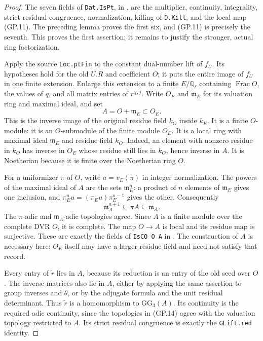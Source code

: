 \begin{proof}
The seven fields of \texttt{Dat.IsPt}, in
, are the multiplier,
continuity, integrality, strict residual congruence,
normalization, killing of \texttt{D.Kill}, and the local map
(GP.11).  The preceding lemma proves the first six, and (GP.11)
is precisely the seventh.  This proves the first assertion;
it remains to justify the stronger, actual ring factorization.

Apply the source \texttt{Loc.ptFin} to the constant dual-number
lift of $f_U$.  Its hypotheses hold for the old $U.R$ and
coefficient $O$; it puts the entire image of $f_U$ in one finite
extension.  Enlarge this extension to a finite $E/\mathbb Q_\ell$
containing $\operatorname{Frac}O$, the values of $q$, and all
matrix entries of $r^{\chi,j}$.  Write $O_E$ and $\mathfrak m_E$
for its valuation ring and maximal ideal, and set
\[
        A=O+\mathfrak m_E\subset O_E.                        \tag{GP.13}
\]
This is the inverse image of the original residue field $k_O$
inside $k_E$.  It is a finite $O$-module: it is an $O$-submodule
of the finite module $O_E$.  It is a local ring with maximal
ideal $\mathfrak m_E$ and residue field $k_O$.  Indeed, an
element with nonzero residue in $k_O$ has inverse in $O_E$
whose residue still lies in $k_O$, hence inverse in $A$.
It is Noetherian because it is finite over the Noetherian ring
$O$.

For a uniformizer $\pi$ of $O$, write $a=v_E(\pi)$ in
integer normalization.  The powers of the maximal ideal of
$A$ are the sets $\mathfrak m_E^n$: a product of $n$ elements
of $\mathfrak m_E$ gives one inclusion, and
$\pi_E^n u=(\pi_Eu)\pi_E^{n-1}$ gives the other.
Consequently
\[
       \mathfrak m_A^{a+1}\subseteq\pi A
                      \subseteq\mathfrak m_A.                \tag{GP.14}
\]
The $\pi$-adic and $\mathfrak m_A$-adic topologies agree.
Since $A$ is a finite module over the complete DVR $O$, it is
complete.  The map $O\to A$ is local and its residue map is
surjective.  These are exactly the fields of \texttt{IsCO O A}
in .
The construction of $A$ is necessary here: $O_E$ itself may
have a larger residue field and need not satisfy that record.

Every entry of $\widetilde r$ lies in $A$, because its reduction
is an entry of the old seed over $O$.  The inverse matrices also
lie in $A$, either by applying the same assertion to group
inverses and $\theta$, or by the adjugate formula and the unit
residual determinant.  Thus $\widetilde r$ is a homomorphism
to $\mathrm{GG}_3(A)$.  Its continuity is the required adic
continuity, since the topologies in (GP.14) agree with the
valuation topology restricted to $A$.  Its strict residual
congruence is exactly the \texttt{GLift.red} identity.


\end{proof}
